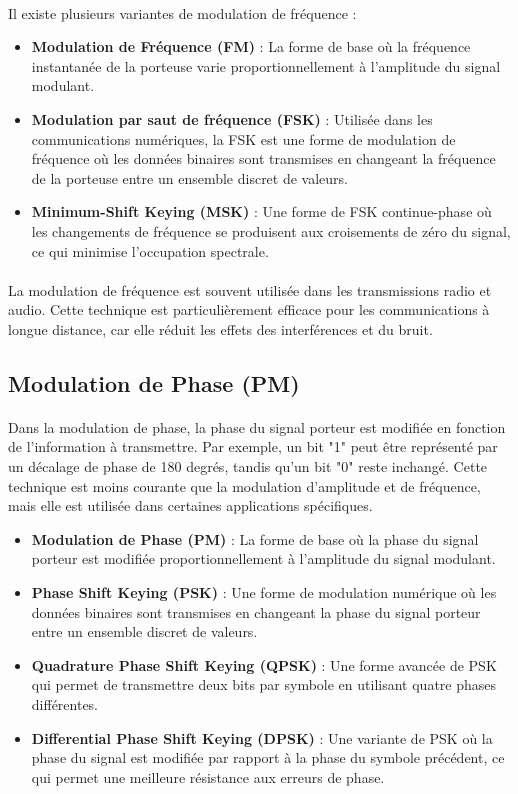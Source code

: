 \documentclass[a4paper,twocolumn]{report}
\begin{document}
\paragraph{}Il existe plusieurs variantes de modulation de fréquence : 
\begin{itemize}
    \item \textbf{Modulation de Fréquence (FM)} : La forme de base où la fréquence instantanée de la porteuse varie proportionnellement à l'amplitude du signal modulant.
    \item \textbf{Modulation par saut de fréquence (FSK)} : Utilisée dans les communications numériques, la FSK est une forme de modulation de fréquence où les données binaires sont transmises en changeant la fréquence de la porteuse entre un ensemble discret de valeurs.
    \item \textbf{Minimum-Shift Keying (MSK)} : Une forme de FSK continue-phase où les changements de fréquence se produisent aux croisements de zéro du signal, ce qui minimise l'occupation spectrale.
\end{itemize}
\paragraph{}La modulation de fréquence est souvent utilisée dans les transmissions radio et audio. Cette technique est particulièrement efficace pour les communications à longue distance, car elle réduit les effets des interférences et du bruit.

\subsection{Modulation de Phase (PM)}
\paragraph{}Dans la modulation de phase, la phase du signal porteur est modifiée en fonction de l'information à transmettre. Par exemple, un bit "1" peut être représenté par un décalage de phase de 180 degrés, tandis qu'un bit "0" reste inchangé. Cette technique est moins courante que la modulation d'amplitude et de fréquence, mais elle est utilisée dans certaines applications spécifiques.
\begin{itemize}
    \item \textbf{Modulation de Phase (PM)} : La forme de base où la phase du signal porteur est modifiée proportionnellement à l'amplitude du signal modulant.
    \item \textbf{Phase Shift Keying (PSK)} : Une forme de modulation numérique où les données binaires sont transmises en changeant la phase du signal porteur entre un ensemble discret de valeurs.
    \item \textbf{Quadrature Phase Shift Keying (QPSK)} : Une forme avancée de PSK qui permet de transmettre deux bits par symbole en utilisant quatre phases différentes.
    \item \textbf{Differential Phase Shift Keying (DPSK)} : Une variante de PSK où la phase du signal est modifiée par rapport à la phase du symbole précédent, ce qui permet une meilleure résistance aux erreurs de phase.
\end{itemize}
\end{document}
